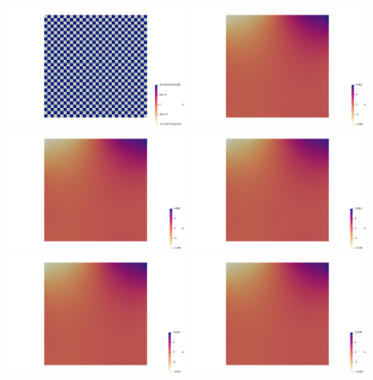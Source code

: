 \begin{center}
\includegraphics[width=6cm]{python_codes/fieldstone_78/results/ldc/32x32/p0}
\includegraphics[width=6cm]{python_codes/fieldstone_78/results/ldc/32x32/p1}\\
\includegraphics[width=6cm]{python_codes/fieldstone_78/results/ldc/32x32/p2}
\includegraphics[width=6cm]{python_codes/fieldstone_78/results/ldc/32x32/p3}\\
\includegraphics[width=6cm]{python_codes/fieldstone_78/results/ldc/32x32/p4}
\includegraphics[width=6cm]{python_codes/fieldstone_78/results/ldc/32x32/p5}\\

\end{center}
